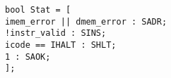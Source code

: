 \documentclass{article}
\begin{document}
\texttt{bool Stat = [ \\
\hspace*{17mm} imem\_error || dmem\_error : SADR; \\
\hspace*{17mm} !instr\_valid : SINS; \\
\hspace*{17mm} icode == IHALT : SHLT; \\
\hspace*{17mm} 1 : SAOK; \\
\hspace*{5mm}];}
\end{document}
